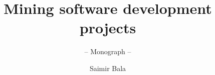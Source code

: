\documentclass[graybox,envcountchap,a4paper]{svmono}
\begin{document}
\author{Saimir Bala}
\title{Mining software development projects}
\subtitle{-- Monograph --}

\frontmatter%



%
%


\tableofcontents

\listoffigures

\listoftables



\mainmatter%
%






















\nocite{*}




\backmatter%

%
\printindex

\end{document}
